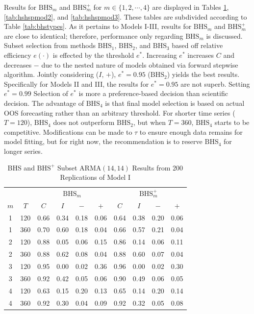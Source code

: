 Results for $\textrm{BHS}_m$ and $\textrm{BHS}^+_m$ for $m \in \{1,2,\cdots,4\}$ are displayed in Tables \ref{tab:hshspmod1}, \ref{tab:hshspmod2}, and \ref{tab:hshspmod3}. These tables are subdivided according to Table \ref{tab:bhstypes}. As it pertains to Models I-III, results for $\textrm{BHS}_m$ and $\textrm{BHS}^+_m$ are close to identical; therefore, performance only regarding $\textrm{BHS}_m$ is discussed. Subset selection from methods $\textrm{BHS}_1$, $\textrm{BHS}_2$, and $\textrm{BHS}_3$ based off relative efficiency $e(\cdot)$ is effected by the threshold $e^*$. Increasing $e^*$ increases $C$ and decreases $-$ due to the nested nature of models obtained via forward stepwise algorithm. Jointly considering ($I$, $+$), $e^*=0.95$ ($\textrm{BHS}_2$) yields the best results. Specifically for Models II and III, the results for $e^*=0.95$ are not superb. Setting $e^*=0.99$ Selection of $e^*$ is more a preference-based decision than scientific decision. The advantage of $\textrm{BHS}_4$ is that final model selection is based on actual OOS forecasting rather than an arbitrary threshold. For shorter time series ($T=120$), $\textrm{BHS}_4$ does not outperform $\textrm{BHS}_2$, but when $T=360$, $\textrm{BHS}_4$ starts to be competitive. Modifications can be made to $\tau$ to ensure enough data remains for model fitting, but for right now, the recommendation is to reserve $\textrm{BHS}_4$ for longer series.


\begin{table}[htbp]
\footnotesize
\centering
\caption{BHS and $\textrm{BHS}^+$ Subset ARMA$(14,14)$ Results from 200 Replications of Model I}
\begin{tabular}{cc|cccc|cccc}
  \hline
  & & \multicolumn{4}{c|}{$\textrm{BHS}_m$} & \multicolumn{4}{c}{$\textrm{BHS}^+_m$} \\
  \cline{4-5}  \cline{8-9}
  $m$ & $T$ & $C$ & $I$ & $-$ & $+$ & $C$ & $I$ & $-$ & $+$ \\
  \hline
  1 & 120 & 0.66 & 0.34 & 0.18 & 0.06 & 0.64 & 0.38 & 0.20 & 0.06 \\ 
  1 & 360 & 0.70 & 0.60 & 0.18 & 0.04 & 0.66 & 0.57 & 0.21 & 0.04 \\ 
  2 & 120 & 0.88 & 0.05 & 0.06 & 0.15 & 0.86 & 0.14 & 0.06 & 0.11 \\ 
  2 & 360 & 0.88 & 0.62 & 0.08 & 0.04 & 0.88 & 0.60 & 0.07 & 0.04 \\ 
  3 & 120 & 0.95 & 0.00 & 0.02 & 0.36 & 0.96 & 0.00 & 0.02 & 0.30 \\ 
  3 & 360 & 0.92 & 0.42 & 0.05 & 0.06 & 0.90 & 0.49 & 0.06 & 0.05 \\ 
  \hline
  4 & 120 & 0.63 & 0.15 & 0.20 & 0.13 & 0.65 & 0.14 & 0.20 & 0.14 \\ 
  4 & 360 & 0.92 & 0.30 & 0.04 & 0.09 & 0.92 & 0.32 & 0.05 & 0.08 \\ 
   \hline
\end{tabular}
\label{tab:hshspmod1}
\end{table}



